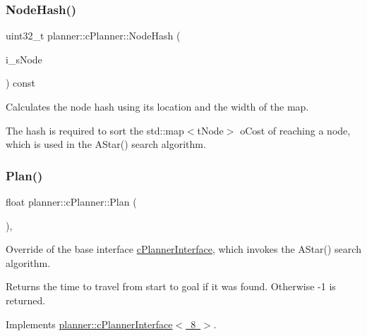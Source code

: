 \subsubsection{\texorpdfstring{Node\+Hash()}{NodeHash()}}
{\footnotesize\ttfamily uint32\+\_\+t planner\+::c\+Planner\+::\+Node\+Hash (\begin{DoxyParamCaption}\item[{const \mbox{\hyperlink{structplanner_1_1t_node}{t\+Node}} $\ast$}]{i\+\_\+s\+Node }\end{DoxyParamCaption}) const}



Calculates the node hash using its location and the width of the map. 

The hash is required to sort the std\+::map$<$t\+Node$>$ o\+Cost of reaching a node, which is used in the A\+Star() search algorithm. \mbox{\label{classplanner_1_1c_planner_a7c4defd454429503d4e47b552a5311fb}} 
\subsubsection{\texorpdfstring{Plan()}{Plan()}}
{\footnotesize\ttfamily float planner\+::c\+Planner\+::\+Plan (\begin{DoxyParamCaption}{ }\end{DoxyParamCaption})\hspace{0.3cm}{\ttfamily [override]}, {\ttfamily [virtual]}}



Override of the base interface \mbox{\hyperlink{classplanner_1_1c_planner_interface}{c\+Planner\+Interface}}, which invokes the A\+Star() search algorithm. 

\begin{DoxyReturn}{Returns}
the time to travel from start to goal if it was found. Otherwise -\/1 is returned. 
\end{DoxyReturn}


Implements \mbox{\hyperlink{classplanner_1_1c_planner_interface_a4d8effce5ee5d097a30465280e9416d6}{planner\+::c\+Planner\+Interface$<$ 8 $>$}}.

\mbox{\label{classplanner_1_1c_planner_a34b0582ca32cc235837c0b638b39e3af}} 
